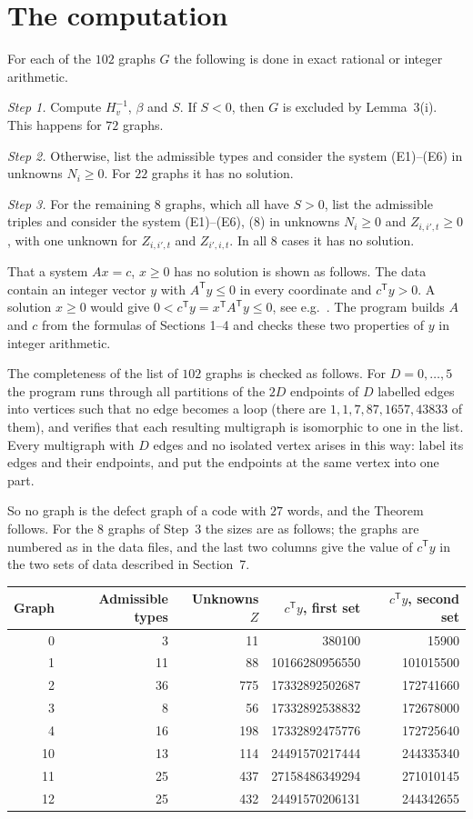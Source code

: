 \documentclass[11pt,a4paper]{article}
\newcommand{\T}{^{\mathsf T}}
\begin{document}
\section{The computation}

For each of the $102$ graphs $G$ the following is done in exact rational or
integer arithmetic.

\emph{Step 1.} Compute $H_v^{-1}$, $\beta$ and $S$. If $S<0$, then $G$ is
excluded by Lemma~3(i). This happens for $72$ graphs.

\emph{Step 2.} Otherwise, list the admissible types and consider the system
(E1)--(E6) in unknowns $N_i\ge 0$. For $22$ graphs it has no solution.

\emph{Step 3.} For the remaining $8$ graphs, which all have $S>0$, list the
admissible triples and consider the system (E1)--(E6), (8) in unknowns
$N_i\ge 0$ and $Z_{i,i',t}\ge 0$, with one unknown for $Z_{i,i',t}$ and
$Z_{i',i,t}$. In all $8$ cases it has no solution.

That a system $Ax=c$, $x\ge 0$ has no solution is shown as follows. The data
contain an integer vector $y$ with $A\T y\le 0$ in every coordinate and
$c\T y>0$. A solution $x\ge 0$ would give
$0<c\T y=x\T A\T y\le 0$, see e.g.~\cite[Section 5.8]{BV}. The program
builds $A$ and $c$ from the formulas of Sections 1--4 and checks these two
properties of $y$ in integer arithmetic.

The completeness of the list of $102$ graphs is checked as follows. For
$D=0,\dots,5$ the program runs through all partitions of the $2D$ endpoints
of $D$ labelled edges into vertices such that no edge becomes a loop (there
are $1,1,7,87,1657,43833$ of them), and verifies that each resulting
multigraph is isomorphic to one in the list. Every multigraph with $D$
edges and no isolated vertex arises in this way: label its edges and their
endpoints, and put the endpoints at the same vertex into one part.

So no graph is the defect graph of a code with $27$ words, and the Theorem
follows. For the $8$ graphs of Step~3 the sizes are as follows; the graphs
are numbered as in the data files, and the last
two columns give the value of $c\T y$ in the two sets of data described in
Section~7.
\begin{center}
\begin{tabular}{rrrrr}
\hline
Graph & Admissible types & Unknowns $Z$ & $c\T y$, first set & $c\T y$, second set\\
\hline
0 & 3 & 11 & 380100 & 15900 \\
1 & 11 & 88 & 10166280956550 & 101015500 \\
2 & 36 & 775 & 17332892502687 & 172741660 \\
3 & 8 & 56 & 17332892538832 & 172678000 \\
4 & 16 & 198 & 17332892475776 & 172725640 \\
10 & 13 & 114 & 24491570217444 & 244335340 \\
11 & 25 & 437 & 27158486349294 & 271010145 \\
12 & 25 & 432 & 24491570206131 & 244342655 \\
\hline
\end{tabular}
\end{center}
\end{document}
